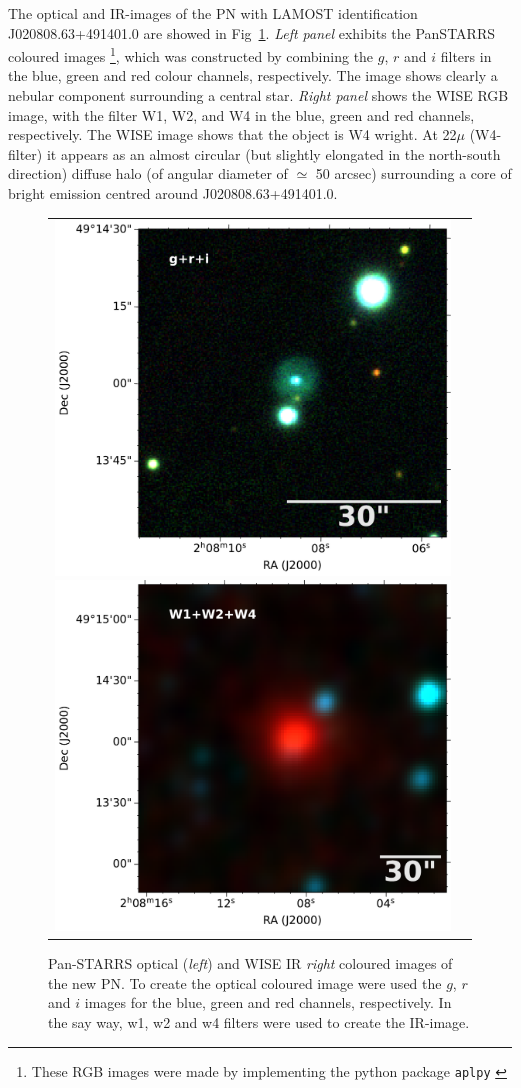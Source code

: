 \documentclass[fleqn,usenatbib]{mnras}
\begin{document}
The optical and IR-images of the PN with LAMOST
identification J020808.63+491401.0 are showed in Fig~\ref{fig:image}.
\textit{Left panel} exhibits the PanSTARRS coloured
images \footnote{These RGB images were made by implementing
the python package \texttt{aplpy} \citep{aplpy:2019}}, which
was constructed by combining the $g$, $r$ and $i$ filters in
the blue, green and red colour channels, respectively.
The image shows clearly a nebular component surrounding 
a central star. \textit{Right panel} shows the
WISE RGB image, with the filter W1, W2, and W4 in
the blue, green and red channels, respectively.
The WISE image shows that the object is W4 wright.  
At 22$\mu$ (W4-filter) it appears as an almost
circular (but slightly elongated in the north-south direction)
diffuse halo (of angular diameter of $\simeq$ 50 arcsec) surrounding
a core of bright emission centred around J020808.63+491401.0. 

\begin{figure}
  \centering
  \begin{tabular}{l l}
\includegraphics[width=0.5\linewidth]{Figs/cutout_rings_v3_skycell_2294_031_stk_i_unconv-irg-RGB.pdf}
\includegraphics[width=0.5\linewidth]{Figs/w4_ra32_035994_dec49_233615-421-RGB.pdf}
\end{tabular}  
  \caption{Pan-STARRS optical (\textit{left}) and WISE IR \textit{right} coloured
    images of the new PN. To create the optical coloured image were used the $g$, $r$ and $i$
    images for the blue, green and red channels, respectively. In the say way, w1, w2 and w4
    filters were used to create the IR-image.} 
  \label{fig:image}
\end{figure}
\end{document}

